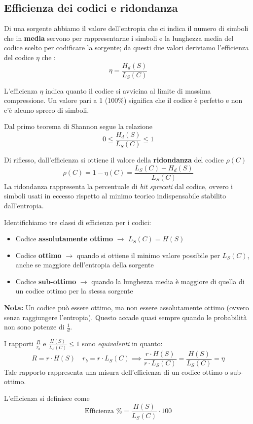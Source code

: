 \subsection{Efficienza dei codici e ridondanza}
Di una sorgente abbiamo il valore dell'entropia che ci indica il numero di simboli che in \textbf{media} servono per rappresentarne i simboli e la lunghezza media del codice scelto per codificare la sorgente; da questi due valori deriviamo l'efficienza del codice $\eta$ che :
\[\eta = \frac{H_d(S)}{L_S(C)}\]

L'efficienza $\eta$ indica quanto il codice si avvicina al limite di massima compressione. Un valore pari a 1 (100\%) significa che il codice è perfetto e non c'è alcuno spreco di simboli.

Dal primo teorema di Shannon segue la relazione
\[0 \leq \frac{H_d(S)}{L_S(C)} \leq 1\]

Di riflesso, dall'efficienza si ottiene il valore della \textbf{ridondanza} del codice $\rho(C)$
\[\rho(C) = 1 - \eta(C) = \frac{L_S(C) - H_d(S)}{L_S(C)}\]
La ridondanza rappresenta la percentuale di \textit{bit sprecati} dal codice, ovvero i simboli usati in eccesso rispetto al minimo teorico indispensabile stabilito dall'entropia.

Identifichiamo tre classi di efficienza per i codici:
\begin{itemize}
    \item Codice \textbf{assolutamente ottimo} $\rightarrow$ $L_S(C) = H(S)$
    \item Codice \textbf{ottimo} $\rightarrow$ quando si ottiene il minimo valore possibile per $L_S(C)$, anche se maggiore dell'entropia della sorgente
    \item Codice \textbf{sub-ottimo} $\rightarrow$ quando la lunghezza media è maggiore di quella di un codice ottimo per la stessa sorgente
\end{itemize}

\textbf{Nota:} Un codice può essere ottimo, ma non essere assolutamente ottimo (ovvero senza raggiungere l'entropia). Questo accade quasi sempre quando le probabilità non sono potenze di $\frac{1}{d}$.

I rapporti $\frac{R}{r_b}$ e $\frac{H(S)}{L_S(C)} \leq 1$ sono \textit{equivalenti} in quanto:
\[ R = r \cdot H(S) \quad r_b= r \cdot L_S(C) \implies \frac{r \cdot H(S)}{ r \cdot L_S(C)}= \frac{H(S)}{L_S(C)}= \eta\]
Tale rapporto rappresenta una misura dell'efficienza di un codice ottimo o sub-ottimo.

L'efficienza si definisce come
\[\text{Efficienza } \% = \frac{H(S)}{L_S(C)} \cdot 100\]

